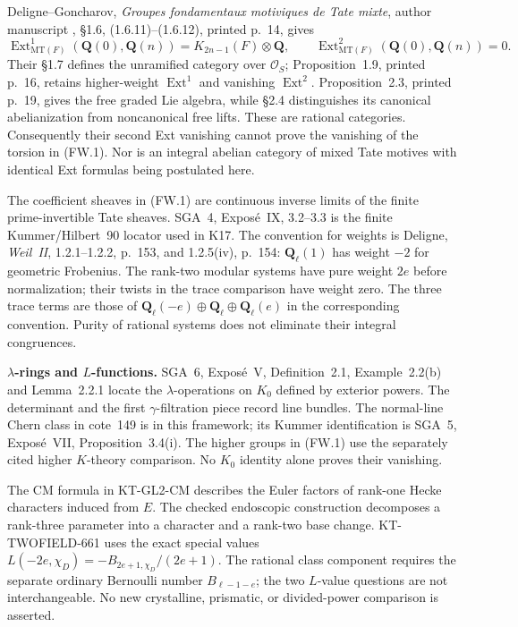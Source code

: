 \documentclass[11pt,a4paper]{article}
\theoremstyle{definition}
\renewcommand{\paragraph}[1]{\par\smallskip\noindent\textbf{#1}\quad\ignorespaces}
\begin{document}
Deligne--Goncharov, \emph{Groupes fondamentaux motiviques de
Tate mixte}, author manuscript , \S1.6,
(1.6.11)--(1.6.12), printed p.~14, gives
\[
 \operatorname{Ext}^1_{\mathrm{MT}(F)}(\mathbf Q(0),\mathbf Q(n))
       =K_{2n-1}(F)\otimes\mathbf Q,\qquad
 \operatorname{Ext}^2_{\mathrm{MT}(F)}(\mathbf Q(0),\mathbf Q(n))=0.
\]
Their \S1.7 defines the unramified category over $\mathcal O_S$;
Proposition~1.9, printed p.~16, retains higher-weight
$\operatorname{Ext}^1$ and vanishing $\operatorname{Ext}^2$.
Proposition~2.3, printed p.~19, gives the free graded Lie algebra,
while \S2.4 distinguishes its canonical abelianization from
noncanonical free lifts. These are rational categories.
Consequently their second Ext vanishing cannot prove the
vanishing of the torsion in (FW.1). Nor is an integral abelian
category of mixed Tate motives with identical Ext formulas
being postulated here.

The coefficient sheaves in (FW.1) are continuous inverse limits
of the finite prime-invertible Tate sheaves. SGA~4, Expos\'e~IX,
3.2--3.3 is the finite Kummer/Hilbert~90 locator used in K17.
The convention for weights is Deligne, \emph{Weil~II},
1.2.1--1.2.2, p.~153, and 1.2.5(iv), p.~154:
$\mathbf Q_\ell(1)$ has weight $-2$ for geometric Frobenius.
The rank-two modular systems have pure weight $2e$ before
normalization; their twists in the trace comparison have weight
zero. The three trace terms are those of
$\mathbf Q_\ell(-e)\oplus\mathbf Q_\ell\oplus\mathbf Q_\ell(e)$
in the corresponding convention. Purity of rational systems
does not eliminate their integral congruences.

\paragraph{$\lambda$-rings and $L$-functions.}
SGA~6, Expos\'e~V, Definition~2.1, Example~2.2(b) and
Lemma~2.2.1 locate the $\lambda$-operations on $K_0$ defined
by exterior powers. The determinant and the first
$\gamma$-filtration piece record line bundles. The normal-line
Chern class in cote~149 is in this framework; its Kummer
identification is SGA~5, Expos\'e~VII, Proposition~3.4(i).
The higher groups in (FW.1) use the separately cited higher
$K$-theory comparison. No $K_0$ identity alone proves their
vanishing.

The CM formula in KT-GL2-CM describes the Euler factors of
rank-one Hecke characters induced from $E$. The checked endoscopic
construction decomposes a rank-three parameter
into a character and a rank-two base change. KT-TWOFIELD-661
uses the exact special values
$L(-2e,\chi_D)=-B_{2e+1,\chi_D}/(2e+1)$.
The rational class component requires the separate ordinary
Bernoulli number $B_{\ell-1-e}$; the two $L$-value questions
are not interchangeable. No new crystalline, prismatic, or
divided-power comparison is asserted.
\end{document}
